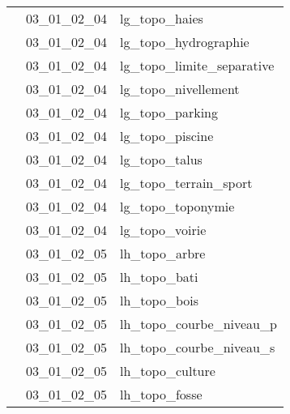 \documentclass[12pt,titlepage,oneside]{book}
\begin{document}
\begin{supertabular}{|p{10cm}|c|p{15cm}|}
                    & 03\_01\_02\_04 & lg\_topo\_haies\\


                    & 03\_01\_02\_04 & lg\_topo\_hydrographie\\


                    & 03\_01\_02\_04 & lg\_topo\_limite\_separative\\


                    & 03\_01\_02\_04 & lg\_topo\_nivellement\\


                    & 03\_01\_02\_04 & lg\_topo\_parking\\


                    & 03\_01\_02\_04 & lg\_topo\_piscine\\


                    & 03\_01\_02\_04 & lg\_topo\_talus\\


                    & 03\_01\_02\_04 & lg\_topo\_terrain\_sport\\


                    & 03\_01\_02\_04 & lg\_topo\_toponymie\\


                    & 03\_01\_02\_04 & lg\_topo\_voirie\\


                    & 03\_01\_02\_05 & lh\_topo\_arbre\\


                    & 03\_01\_02\_05 & lh\_topo\_bati\\


                    & 03\_01\_02\_05 & lh\_topo\_bois\\


                    & 03\_01\_02\_05 & lh\_topo\_courbe\_niveau\_p\\


                    & 03\_01\_02\_05 & lh\_topo\_courbe\_niveau\_s\\


                    & 03\_01\_02\_05 & lh\_topo\_culture\\


                    & 03\_01\_02\_05 & lh\_topo\_fosse\\



\end{supertabular}
\end{document}
